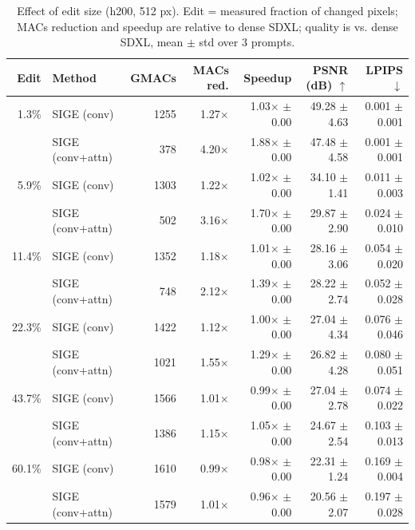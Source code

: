 \begin{table}[t]
\centering
\small
\caption{Effect of edit size (h200, 512 px). Edit = measured fraction of changed pixels; MACs reduction and speedup are relative to dense SDXL; quality is vs. dense SDXL, mean $\pm$ std over 3 prompts.}
\label{tab:edit_size_h200}
\begin{tabular}{rlrrrrr}
\toprule
Edit & Method & GMACs & MACs red. & Speedup & PSNR (dB) $\uparrow$ & LPIPS $\downarrow$ \\
\midrule
1.3\% & SIGE (conv) & 1255 & 1.27$\times$ & 1.03$\times$ $\pm$ 0.00 & 49.28 $\pm$ 4.63 & 0.001 $\pm$ 0.001 \\
 & SIGE (conv+attn) & 378 & 4.20$\times$ & 1.88$\times$ $\pm$ 0.00 & 47.48 $\pm$ 4.58 & 0.001 $\pm$ 0.001 \\
\midrule
5.9\% & SIGE (conv) & 1303 & 1.22$\times$ & 1.02$\times$ $\pm$ 0.00 & 34.10 $\pm$ 1.41 & 0.011 $\pm$ 0.003 \\
 & SIGE (conv+attn) & 502 & 3.16$\times$ & 1.70$\times$ $\pm$ 0.00 & 29.87 $\pm$ 2.90 & 0.024 $\pm$ 0.010 \\
\midrule
11.4\% & SIGE (conv) & 1352 & 1.18$\times$ & 1.01$\times$ $\pm$ 0.00 & 28.16 $\pm$ 3.06 & 0.054 $\pm$ 0.020 \\
 & SIGE (conv+attn) & 748 & 2.12$\times$ & 1.39$\times$ $\pm$ 0.00 & 28.22 $\pm$ 2.74 & 0.052 $\pm$ 0.028 \\
\midrule
22.3\% & SIGE (conv) & 1422 & 1.12$\times$ & 1.00$\times$ $\pm$ 0.00 & 27.04 $\pm$ 4.34 & 0.076 $\pm$ 0.046 \\
 & SIGE (conv+attn) & 1021 & 1.55$\times$ & 1.29$\times$ $\pm$ 0.00 & 26.82 $\pm$ 4.28 & 0.080 $\pm$ 0.051 \\
\midrule
43.7\% & SIGE (conv) & 1566 & 1.01$\times$ & 0.99$\times$ $\pm$ 0.00 & 27.04 $\pm$ 2.78 & 0.074 $\pm$ 0.022 \\
 & SIGE (conv+attn) & 1386 & 1.15$\times$ & 1.05$\times$ $\pm$ 0.00 & 24.67 $\pm$ 2.54 & 0.103 $\pm$ 0.013 \\
\midrule
60.1\% & SIGE (conv) & 1610 & 0.99$\times$ & 0.98$\times$ $\pm$ 0.00 & 22.31 $\pm$ 1.24 & 0.169 $\pm$ 0.004 \\
 & SIGE (conv+attn) & 1579 & 1.01$\times$ & 0.96$\times$ $\pm$ 0.00 & 20.56 $\pm$ 2.07 & 0.197 $\pm$ 0.028 \\
\bottomrule
\end{tabular}
\end{table}

